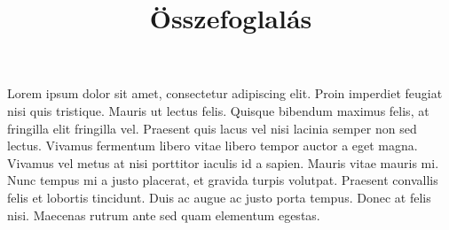 \documentclass[../Main.tex]{subfiles}
\begin{document}
\title{Összefoglalás}

Lorem ipsum dolor sit amet, consectetur adipiscing elit.
Proin imperdiet feugiat nisi quis tristique. Mauris ut lectus felis.
Quisque bibendum maximus felis, at fringilla elit fringilla vel.
Praesent quis lacus vel nisi lacinia semper non sed lectus.
Vivamus fermentum libero vitae libero tempor auctor a eget magna.
Vivamus vel metus at nisi porttitor iaculis id a sapien. 
Mauris vitae mauris mi. Nunc tempus mi a justo placerat, et gravida turpis volutpat.
Praesent convallis felis et lobortis tincidunt. Duis ac augue ac justo porta tempus.
Donec at felis nisi. Maecenas rutrum ante sed quam elementum egestas.
\end{document}
